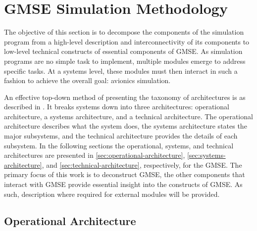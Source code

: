 \section{GMSE Simulation Methodology}
\label{sec:sim-method}

The objective of this section is to decompose the components of the simulation program from a
high-level description and interconnectivity of its components to low-level technical constructs of
essential components of GMSE. As simulation programs are no simple task to implement, multiple
modules emerge to address specific tasks. At a systems level, these modules must then interact in
such a fashion to achieve the overall goal: avionics simulation.

An effective top-down method of presenting the taxonomy of architectures is as described in
\cite{levis_c4isr_2000}. It breaks systems down into three architectures: operational architecture,
a systems architecture, and a technical architecture. The operational architecture describes what
the system does, the systems architecture states the major subsystems, and the technical
architecture provides the details of each subsystem. In the following sections the operational,
systems, and technical architectures are presented in \autoref{sec:operational-architecture},
\autoref{sec:systems-architecture}, and \autoref{sec:technical-architecture}, respectively, for the
GMSE. The primary focus of this work is to deconstruct GMSE, the other components that interact with
GMSE provide essential insight into the constructs of GMSE. As such, description where required for
external modules will be provided.

\subsection{Operational Architecture}
\label{sec:operational-architecture}

